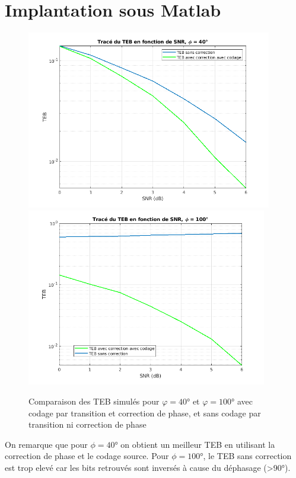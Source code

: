 \documentclass[11pt,a4paper]{report}
\begin{document}
\chapter{Implantation sous Matlab}



\begin{figure}[H]
    \centering
    \includegraphics[height=7.8cm]{Screenshots/4_1_1.png}
    \includegraphics[height=7.8cm]{Screenshots/4_1_2.png}
    \caption{Comparaison des TEB simulés pour $\varphi = 40$° et $\varphi = 100$° avec codage par transition et correction de phase, et sans codage par transition ni correction de phase}
    \label{fig:un_label} 
\end{figure}

On remarque que pour $\phi = 40$° on obtient un meilleur TEB en utilisant la correction de phase et le codage source. Pour $\phi = 100$°, le TEB sans correction est trop elevé car les bits retrouvés sont inversés à cause du déphasage (>90°).

\end{document}

